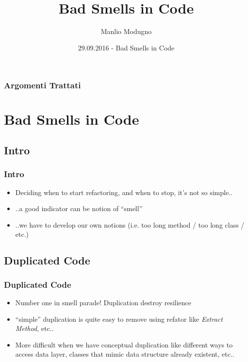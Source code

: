 \documentclass{beamer}
\title{Bad Smells in Code}
\author{Manlio Modugno}
\institute[GMTechnologies]
\date[29.09.2016] 
{29.09.2016 - Bad Smells in Code}
\begin{document}
\begin{frame}
  \titlepage
\end{frame}

\begin{frame}
  \frametitle{Argomenti Trattati}
  \tableofcontents
\end{frame}

\section{Bad Smells in Code}
\subsection{Intro}
\begin{frame}
  \frametitle{Intro}
  \begin{itemize}
	\item<+-> Deciding when to start refactoring, and when to stop, it's not so simple.. 
	\item<+-> ..a good indicator can be notion of ``smell'' 
	\item<+-> ..we have to develop our own notions (i.e. too long method / too long class / etc.)
  \end{itemize}
\end{frame}

\subsection{Duplicated Code}
\begin{frame}
  \frametitle{Duplicated Code}
  \begin{itemize}
	\item<+-> Number one in smell parade! Duplication destroy resilience
	\item<+-> ``simple'' duplication is quite easy to remove using refator like \textit{Extract Method}, etc..
	\item<+-> More difficult when we have conceptual duplication like different ways to access data layer, classes that mimic data structure already existent, etc..
  \end{itemize}
\end{frame}
\end{document}
